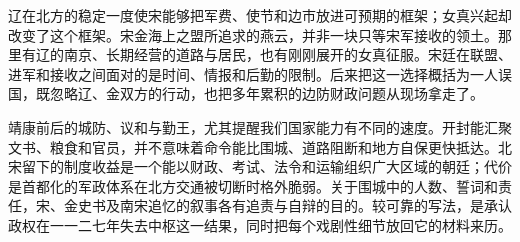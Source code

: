 辽在北方的稳定一度使宋能够把军费、使节和边市放进可预期的框架；女真兴起却改变了这个框架。宋金海上之盟所追求的燕云，并非一块只等宋军接收的领土。那里有辽的南京、长期经营的道路与居民，也有刚刚展开的女真征服。宋廷在联盟、进军和接收之间面对的是时间、情报和后勤的限制。后来把这一选择概括为一人误国，既忽略辽、金双方的行动，也把多年累积的边防财政问题从现场拿走了。

靖康前后的城防、议和与勤王，尤其提醒我们国家能力有不同的速度。开封能汇聚文书、粮食和官员，并不意味着命令能比围城、道路阻断和地方自保更快抵达。北宋留下的制度收益是一个能以财政、考试、法令和运输组织广大区域的朝廷；代价是首都化的军政体系在北方交通被切断时格外脆弱。关于围城中的人数、誓词和责任，宋、金史书及南宋追忆的叙事各有追责与自辩的目的。较可靠的写法，是承认政权在一一二七年失去中枢这一结果，同时把每个戏剧性细节放回它的材料来历。
